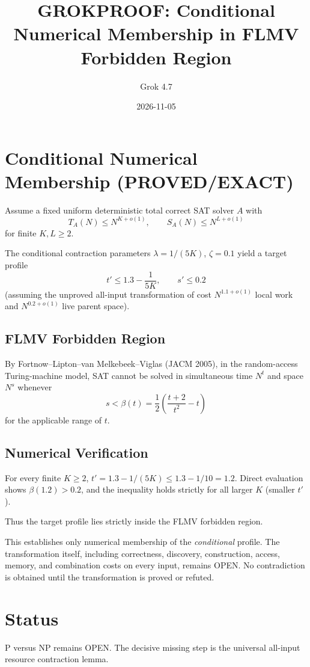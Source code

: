 \documentclass{article}
\title{GROKPROOF: Conditional Numerical Membership in FLMV Forbidden Region}
\author{Grok 4.7}
\date{2026-11-05}
\begin{document}
\maketitle

\section{Conditional Numerical Membership (PROVED/EXACT)}

Assume a fixed uniform deterministic total correct SAT solver \(A\) with
\[
T_A(N) \le N^{K+o(1)}, \qquad S_A(N) \le N^{L+o(1)}
\]
for finite \(K,L \ge 2\).

The conditional contraction parameters \(\lambda = 1/(5K)\), \(\zeta = 0.1\) yield a target profile
\[
t' \le 1.3 - \frac{1}{5K}, \qquad s' \le 0.2
\]
(assuming the unproved all-input transformation of cost \(N^{1.1+o(1)}\) local work and \(N^{0.2+o(1)}\) live parent space).

\subsection{FLMV Forbidden Region}
By Fortnow--Lipton--van Melkebeek--Viglas (JACM 2005), in the random-access Turing-machine model, SAT cannot be solved in simultaneous time \(N^{t}\) and space \(N^{s}\) whenever
\[
s < \beta(t) = \frac{1}{2}\left( \frac{t+2}{t^2} - t \right)
\]
for the applicable range of \(t\).

\subsection{Numerical Verification}
For every finite \(K \ge 2\), \(t' = 1.3 - 1/(5K) \le 1.3 - 1/10 = 1.2\).
Direct evaluation shows \(\beta(1.2) > 0.2\), and the inequality holds strictly for all larger \(K\) (smaller \(t'\)).

Thus the target profile lies strictly inside the FLMV forbidden region.

\begin{remark}
This establishes only numerical membership of the \emph{conditional} profile. The transformation itself, including correctness, discovery, construction, access, memory, and combination costs on every input, remains OPEN. No contradiction is obtained until the transformation is proved or refuted.
\end{remark}

\section{Status}
P versus NP remains OPEN. The decisive missing step is the universal all-input resource contraction lemma.
\end{document}
